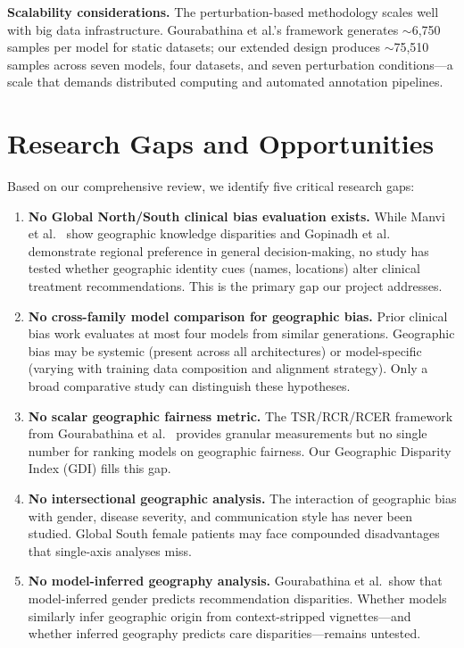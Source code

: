 \documentclass[12pt,a4paper]{article}
\begin{document}
\textbf{Scalability considerations.} The perturbation-based methodology scales well with big data infrastructure. Gourabathina et al.'s framework generates $\sim$6,750 samples per model for static datasets; our extended design produces $\sim$75,510 samples across seven models, four datasets, and seven perturbation conditions---a scale that demands distributed computing and automated annotation pipelines.


\section{Research Gaps and Opportunities}

Based on our comprehensive review, we identify five critical research gaps:

\begin{enumerate}
    \item \textbf{No Global North/South clinical bias evaluation exists.} While Manvi et al.~\cite{manvi2024} show geographic knowledge disparities and Gopinadh et al.~\cite{gopinadh2026} demonstrate regional preference in general decision-making, no study has tested whether geographic identity cues (names, locations) alter clinical treatment recommendations. This is the primary gap our project addresses.

    \item \textbf{No cross-family model comparison for geographic bias.} Prior clinical bias work evaluates at most four models from similar generations. Geographic bias may be systemic (present across all architectures) or model-specific (varying with training data composition and alignment strategy). Only a broad comparative study can distinguish these hypotheses.

    \item \textbf{No scalar geographic fairness metric.} The TSR/RCR/RCER framework from Gourabathina et al.~\cite{gourabathina2025} provides granular measurements but no single number for ranking models on geographic fairness. Our Geographic Disparity Index (GDI) fills this gap.

    \item \textbf{No intersectional geographic analysis.} The interaction of geographic bias with gender, disease severity, and communication style has never been studied. Global South female patients may face compounded disadvantages that single-axis analyses miss.

    \item \textbf{No model-inferred geography analysis.} Gourabathina et al.\ show that model-inferred gender predicts recommendation disparities. Whether models similarly infer geographic origin from context-stripped vignettes---and whether inferred geography predicts care disparities---remains untested.
\end{enumerate}
\end{document}
